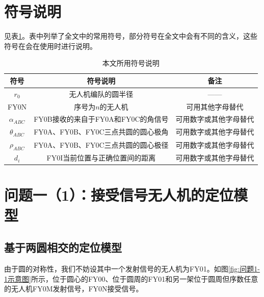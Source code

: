 \documentclass[12pt,AutoFakeSlant,AutoFakeBold]{article}
\begin{document}

\section{符号说明}

见表\ref{tab:符号说明}。表中列举了全文中的常用符号，部分符号在全文中会有不同的含义，这些符号在会在使用时进行说明。

\begin{table}[!ht]
    \centering
    \caption{本文所用符号说明}
    \label{tab:符号说明}
    \begin{tabular}{ccc}
        \toprule
        符号  &  符号说明 & 备注\\
        \midrule
        $r_0$ & 无人机编队的圆半径 & ——\\
        FY0N  & 序号为$n$的无人机 & 可用其他字母替代\\
        $\alpha_{ABC}$ & FY0B接收的来自于FY0A和FY0C的角信号 & 可用数字或其他字母替代\\
        $\theta_{ABC}$ & FY0A、FY0B、FY0C三点共圆的圆心极角& 可用数字或其他字母替代\\
        $\rho_{ABC}$ & FY0A、FY0B、FY0C三点共圆的圆心极径& 可用数字或其他字母替代\\
        $d_{i}$ & FY0I当前位置与正确位置间的距离 & 可用数字或其他字母替代\\
        \bottomrule
    \end{tabular}
\end{table}


\section{问题一（1）：接受信号无人机的定位模型}

\subsection{基于两圆相交的定位模型}

由于圆的对称性，我们不妨设其中一个发射信号的无人机为FY01。如图\ref{fig:问题1-1示意图}所示，位于圆心的FY00、位于圆周的FY01和另一架位于圆周但序数任意的无人机FY0M发射信号，FY0N接受信号。
\end{document}
